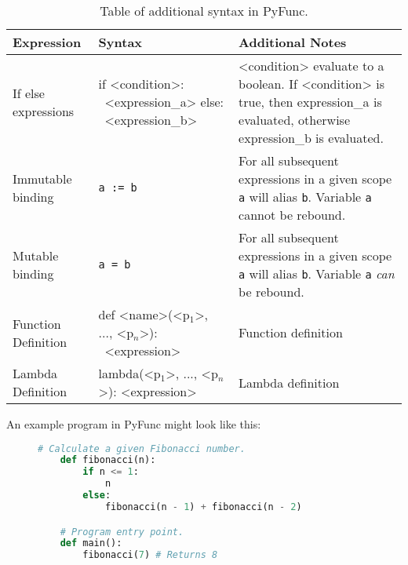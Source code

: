 \documentclass{l4proj}
\begin{document}
\begin{table}[!h]
    \caption{Table of additional syntax in PyFunc.}
    \begin{center}

    \begin{tabular}{@{}|l|p{5cm}|p{4cm}|@{}}
        \hline
        \textbf{Expression}  &   \textbf{Syntax}     &   \textbf{Additional Notes}   \\
        \hline
        \hline
        If else expressions & if <condition>: \newline \-\ <expression\_a> \newline else: \newline \-\ <expression\_b> & <condition> evaluate to a boolean. If <condition> is true, then expression\_a is evaluated, otherwise expression\_b is evaluated.\\
        \hline
        Immutable binding   & \texttt{a := b}   & For all subsequent expressions in a given scope \texttt{a} will alias \texttt{b}. Variable \texttt{a} cannot be rebound. \\
        \hline
        Mutable binding & \texttt{a = b} & For all subsequent expressions in a given scope \texttt{a} will alias \texttt{b}. Variable \texttt{a} \emph{can} be rebound.\\
        \hline
        Function Definition & def <name>(<p$_1$>, ..., <p$_n$>): \newline \-\ <expression> & Function definition\\
        \hline
        Lambda Definition & lambda(<p$_1$>, ..., <p$_n$>): <expression> & Lambda definition \\
        \hline
        
    \end{tabular}
    \end{center}
\end{table}

An example program in PyFunc might look like this:
\begin{figure}[!h]
\begin{lstlisting}[language=python, caption={The simple recursive function to calculate a given fibonacci number.}, label=lst:callahan]
    # Calculate a given Fibonacci number.
    def fibonacci(n):
        if n <= 1:
            n
        else:
            fibonacci(n - 1) + fibonacci(n - 2)

    # Program entry point.
    def main():
        fibonacci(7) # Returns 8
\end{lstlisting}
\end{figure}
\end{document}
